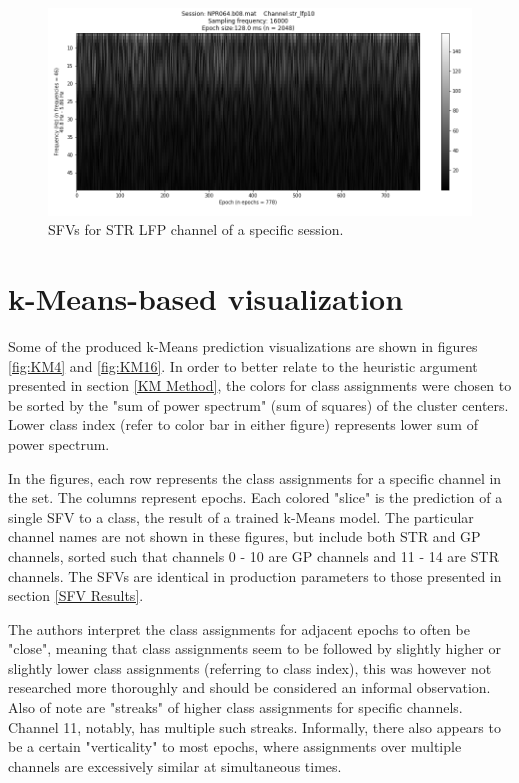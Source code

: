 \documentclass{kththesis}
\begin{document}
\begin{figure}[H]
    \centering
    \centerline{\includegraphics[width=1\textwidth]{images/STR2.png}}
    \caption{SFVs for STR LFP channel of a specific session.}
    \label{fig:STR2}
\end{figure}

\section{k-Means-based visualization}\label{KM Results}

Some of the produced k-Means prediction visualizations are shown in figures \ref{fig:KM4} and \ref{fig:KM16}.
In order to better relate to the heuristic argument presented in section \ref{KM Method}, the colors for class assignments were chosen to be sorted by the "sum of power spectrum" (sum of squares) of the cluster centers.
Lower class index (refer to color bar in either figure) represents lower sum of power spectrum.

In the figures, each row represents the class assignments for a specific channel in the set.
The columns represent epochs.
Each colored "slice" is the prediction of a single SFV to a class, the result of a trained k-Means model.
The particular channel names are not shown in these figures, but include both STR and GP channels, sorted such that channels 0 - 10 are GP channels and 11 - 14 are STR channels.
The SFVs are identical in production parameters to those presented in section \ref{SFV Results}.

The authors interpret the class assignments for adjacent epochs to often be "close", meaning that class assignments seem to be followed by slightly higher or slightly lower class assignments (referring to class index), this was however not researched more thoroughly and should be considered an informal observation.
Also of note are "streaks" of higher class assignments for specific channels.
Channel 11, notably, has multiple such streaks.
Informally, there also appears to be a certain "verticality" to most epochs, where assignments over multiple channels are excessively similar at simultaneous times.
\end{document}

